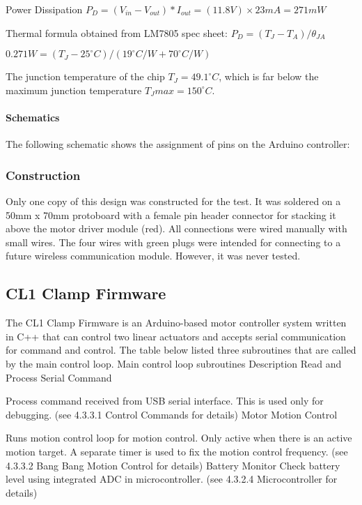 Power Dissipation $P_D = (V_{in} - V_{out}) * I_{out} = (11.8V) \times 23mA = 271mW$

Thermal formula obtained from LM7805 spec sheet:
$P_D = (T_J - T_A) / \theta_{JA}$

$0.271W = (T_J - 25^{\circ}C) / (19^{\circ}C/W + 70^{\circ}C/W)$

The junction temperature of the chip $T_J = 49.1^{\circ}C$, which is far below the maximum junction temperature $T_J{max} = 150^{\circ}C$.

\paragraph{Schematics}

The following schematic shows the assignment of pins on the Arduino controller:

\subsubsection{Construction}
Only one copy of this design was constructed for the test. It was soldered on a 50mm x 70mm protoboard with a female pin header connector for stacking it above the motor driver module (red). All connections were wired manually with small wires. The four wires with green plugs were intended for connecting to a future wireless communication module. However, it was never tested.

\subsection{CL1 Clamp Firmware}
The CL1 Clamp Firmware is an Arduino-based motor controller system written in C++ that can control two linear actuators and accepts serial communication for command and control. The table below listed three subroutines that are called by the main control loop.
Main control loop subroutines
Description
Read and Process Serial Command 


Process command received from USB serial interface. This is used only for debugging. (see 4.3.3.1 Control Commands for details)
Motor Motion Control


Runs motion control loop for motion control. Only active when there is an active motion target. A separate timer is used to fix the motion control frequency. (see 4.3.3.2 Bang Bang Motion Control for details)
Battery Monitor
Check battery level using integrated ADC in microcontroller. 
(see 4.3.2.4 Microcontroller for details)

